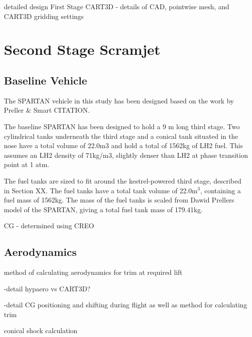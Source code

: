 	detailed design
	First Stage CART3D
	- details of CAD, pointwise mesh, and CART3D gridding settings
	
	
	\section{Second Stage Scramjet}
		\subsection{Baseline Vehicle}
		The SPARTAN vehicle in this study has been designed based on the work by Preller \& Smart CITATION. 
		
		The baseline SPARTAN has been designed to hold a 9 m long third stage.  Two cylindrical tanks underneath the third stage and a conical tank situated in the nose have a total volume of 22.0m3 and hold a total of 1562kg of LH2 fuel. This assumes an LH2 density of 71kg/m3, slightly denser than LH2 at phase transition point at 1 atm.
		
		
		
		The fuel tanks are sized to fit around the kestrel-powered third stage, described in Section XX. 
The fuel tanks have a total tank volume of 22.0m$^3$, containing a fuel mass of 1562kg.
The mass of the fuel tanks is scaled from Dawid Prellers model of the SPARTAN, giving a total fuel tank mass of 179.41kg.
		
		
		CG - determined using CREO
		
		\subsection{Aerodynamics}
		method of calculating aerodynamics for trim at required lift
		
		-detail hypaero vs CART3D? 
		
		-detail  CG positioning and shifting during flight as well as method for calculating trim
		
		conical shock calculation
		
